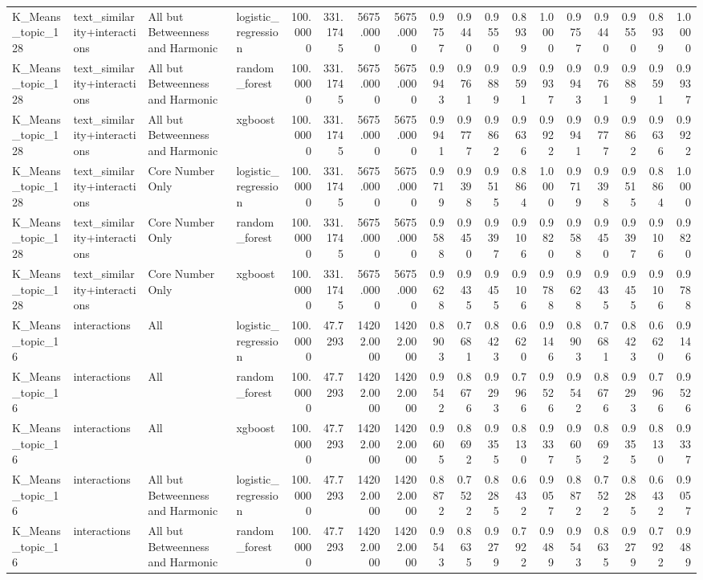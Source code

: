 \begin{tabular}{llllrrrrrrrrrrrrrr}
K_Means_topic_128 & text_similarity+interactions & All but Betweenness and Harmonic & logistic_regression & 100.0000 & 331.1745 & 5675.0000 & 5675.0000 & 0.9757 & 0.9440 & 0.9550 & 0.8939 & 1.0000 & 0.9757 & 0.9440 & 0.9550 & 0.8939 & 1.0000 \\
K_Means_topic_128 & text_similarity+interactions & All but Betweenness and Harmonic & random_forest & 100.0000 & 331.1745 & 5675.0000 & 5675.0000 & 0.9943 & 0.9761 & 0.9889 & 0.9591 & 0.9937 & 0.9943 & 0.9761 & 0.9889 & 0.9591 & 0.9937 \\
K_Means_topic_128 & text_similarity+interactions & All but Betweenness and Harmonic & xgboost & 100.0000 & 331.1745 & 5675.0000 & 5675.0000 & 0.9941 & 0.9777 & 0.9862 & 0.9636 & 0.9922 & 0.9941 & 0.9777 & 0.9862 & 0.9636 & 0.9922 \\
K_Means_topic_128 & text_similarity+interactions & Core Number Only & logistic_regression & 100.0000 & 331.1745 & 5675.0000 & 5675.0000 & 0.9719 & 0.9398 & 0.9515 & 0.8864 & 1.0000 & 0.9719 & 0.9398 & 0.9515 & 0.8864 & 1.0000 \\
K_Means_topic_128 & text_similarity+interactions & Core Number Only & random_forest & 100.0000 & 331.1745 & 5675.0000 & 5675.0000 & 0.9588 & 0.9450 & 0.9397 & 0.9106 & 0.9820 & 0.9588 & 0.9450 & 0.9397 & 0.9106 & 0.9820 \\
K_Means_topic_128 & text_similarity+interactions & Core Number Only & xgboost & 100.0000 & 331.1745 & 5675.0000 & 5675.0000 & 0.9628 & 0.9435 & 0.9455 & 0.9106 & 0.9788 & 0.9628 & 0.9435 & 0.9455 & 0.9106 & 0.9788 \\
K_Means_topic_16 & interactions & All & logistic_regression & 100.0000 & 47.7293 & 14202.0000 & 14202.0000 & 0.8903 & 0.7681 & 0.8423 & 0.6620 & 0.9146 & 0.8903 & 0.7681 & 0.8423 & 0.6620 & 0.9146 \\
K_Means_topic_16 & interactions & All & random_forest & 100.0000 & 47.7293 & 14202.0000 & 14202.0000 & 0.9542 & 0.8676 & 0.9293 & 0.7966 & 0.9526 & 0.9542 & 0.8676 & 0.9293 & 0.7966 & 0.9526 \\
K_Means_topic_16 & interactions & All & xgboost & 100.0000 & 47.7293 & 14202.0000 & 14202.0000 & 0.9605 & 0.8692 & 0.9355 & 0.8130 & 0.9337 & 0.9605 & 0.8692 & 0.9355 & 0.8130 & 0.9337 \\
K_Means_topic_16 & interactions & All but Betweenness and Harmonic & logistic_regression & 100.0000 & 47.7293 & 14202.0000 & 14202.0000 & 0.8872 & 0.7522 & 0.8285 & 0.6432 & 0.9057 & 0.8872 & 0.7522 & 0.8285 & 0.6432 & 0.9057 \\
K_Means_topic_16 & interactions & All but Betweenness and Harmonic & random_forest & 100.0000 & 47.7293 & 14202.0000 & 14202.0000 & 0.9543 & 0.8635 & 0.9279 & 0.7922 & 0.9489 & 0.9543 & 0.8635 & 0.9279 & 0.7922 & 0.9489 \\

\end{tabular}
